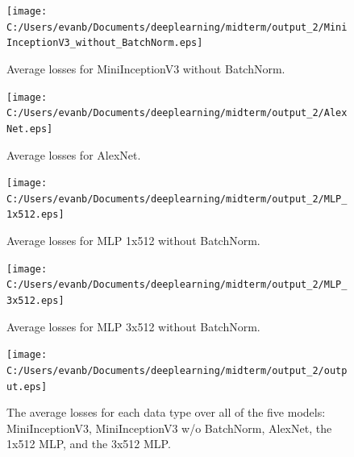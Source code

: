 \documentclass[12pt]{article}
\begin{document}
\begin{figure}[H]
		\centering
		\texttt{[image: C:/Users/evanb/Documents/deeplearning/midterm/output\_2/MiniInceptionV3\_without\_BatchNorm.eps]}
		\caption{Average losses for MiniInceptionV3 without BatchNorm.}
\end{figure}

\begin{figure}[H]
		\centering
		\texttt{[image: C:/Users/evanb/Documents/deeplearning/midterm/output\_2/AlexNet.eps]}
		\caption{Average losses for AlexNet.}
\end{figure}

\begin{figure}[H]
		\centering
		\texttt{[image: C:/Users/evanb/Documents/deeplearning/midterm/output\_2/MLP\_1x512.eps]}
		\caption{Average losses for MLP 1x512 without BatchNorm.}
\end{figure}

\begin{figure}[H]
		\centering
		\texttt{[image: C:/Users/evanb/Documents/deeplearning/midterm/output\_2/MLP\_3x512.eps]}
		\caption{Average losses for MLP 3x512 without BatchNorm.}
\end{figure}

\begin{figure}[H]
	\centering
	\texttt{[image: C:/Users/evanb/Documents/deeplearning/midterm/output\_2/output.eps]}
	\caption{The average losses for each data type over all of the five models: MiniInceptionV3, MiniInceptionV3 w/o BatchNorm, AlexNet, the 1x512 MLP, and the 3x512 MLP.}
\end{figure}
\end{document}
